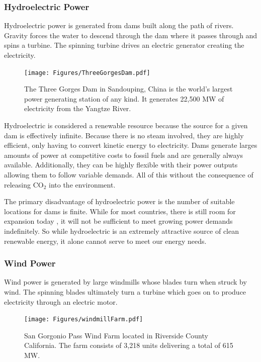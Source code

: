 	\subsubsection{Hydroelectric Power}
	
		Hydroelectric power is generated from dams built along the path of rivers. Gravity forces the water to descend through the dam where it passes through and spins a turbine. The spinning turbine drives an electric generator creating the electricity.
		
		\begin{figure}[h!]
			\centering
			\texttt{[image: Figures/ThreeGorgesDam.pdf]}
			\caption[Three Gorges Dam]{The Three Gorges Dam in Sandouping, China is the world's largest power generating station of any kind. It generates 22,500 MW of electricity from the Yangtze River. \cite{cleveland_handbook_2014, ehrlich_renewable_2014, Image_ThreeGorgesDam}}
		\end{figure}
	
		Hydroelectric is considered a renewable resource because the source for a given dam is effectively infinite. \cite{bibid} Because there is no steam involved, they are highly efficient, only having to convert kinetic energy to electricity. \cite{bibid} Dams generate larges amounts of power at competitive costs to fossil fuels \cite{bibid} and are generally always available. \cite{bibid} Additionally, they can be highly flexible with their power outputs allowing them to follow variable demands. \cite{bibid} All of this without the consequence of releasing CO$_2$ into the environment. \cite{bibid}
		
		The primary disadvantage of hydroelectric power is the number of suitable locations for dams is finite. \cite{bibid} While for most countries, there is still room for expansion today \cite{bibid}, it will not be sufficient to meet growing power demands indefinitely. So while hydroelectric is an extremely attractive source of clean renewable energy, it alone cannot serve to meet our energy needs.
		
	
	\subsubsection{Wind Power}
	
		Wind power is generated by large windmills whose blades turn when struck by wind. The spinning blades ultimately turn a turbine which goes on to produce electricity  through an electric motor. \cite{bibid}
		
		\begin{figure}[h!]
			\centering
			\texttt{[image: Figures/windmillFarm.pdf]}
			\caption[San Gorgonio Pass Wind Farm]{San Gorgonio Pass Wind Farm located in Riverside County California. The farm consists of 3,218 units delivering a total of 615 MW. \cite{noauthor_awea_2010, Image_WindFarm} }
		\end{figure}
	
